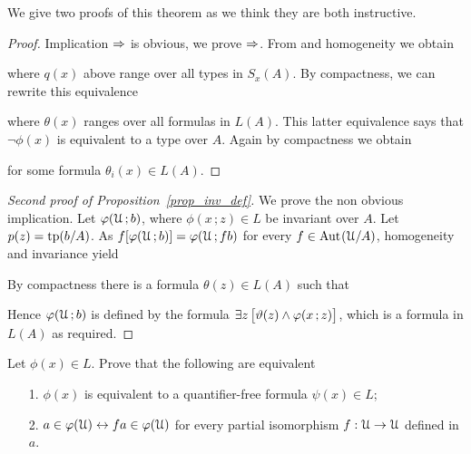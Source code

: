 \documentclass[creche.tex]{subfiles}
\begin{document}
We give two proofs of this theorem as we think they are both instructive. 

\begin{proof}
 Implication $\Rightarrow$ is obvious, we prove $\Rightarrow$. From  and homogeneity we obtain


where $q(x)$ above range over all types in $S_x(A)$. By compactness, we can rewrite this equivalence 


where $\theta(x)$ ranges over all formulas in $L(A)$.  This latter equivalence says that $\neg\phi(x)$ is equivalent to a type over $A$. Again by compactness we obtain 


for some formula $\theta_i(x)\in L(A)$.
\end{proof}


\begin{proof}[Second proof of Proposition~\ref{prop_inv_def}] We prove the non obvious implication. Let $\varphi(\EuScript U\,;b)$, where $\phi(x\,;z)\in L$ be invariant over $A$. Let $p(z)={\rm tp}(b/A)$. As $f[\varphi(\EuScript U\,;b)]=\varphi(\EuScript U\,;fb)$  for every $f\in\textrm{Aut\kern.15ex}(\EuScript U/A)$, homogeneity and invariance yield


By compactness there is a formula $\theta(z)\in L(A)$ such that 


Hence  $\varphi(\EuScript U\,;b)$ is defined by the formula $\exists z\,\big[\vartheta(z)\wedge\varphi(x\,;z)\big]$, which is a formula in $L(A)$ as required.
\end{proof}

\begin{exercise}
Let $\phi(x)\in L$. Prove that the following are equivalent
\begin{itemize}
 \item[1.] $\phi(x)$ is equivalent to a quantifier-free formula $\psi(x)\in L$;
 \item[2.] $a\in\varphi(\EuScript U)\leftrightarrow fa\in\varphi(\EuScript U)$ for every partial isomorphism $f:\EuScript U\to\EuScript U$ defined in $a$.\QED
\end{itemize}
\end{exercise}
\end{document}

